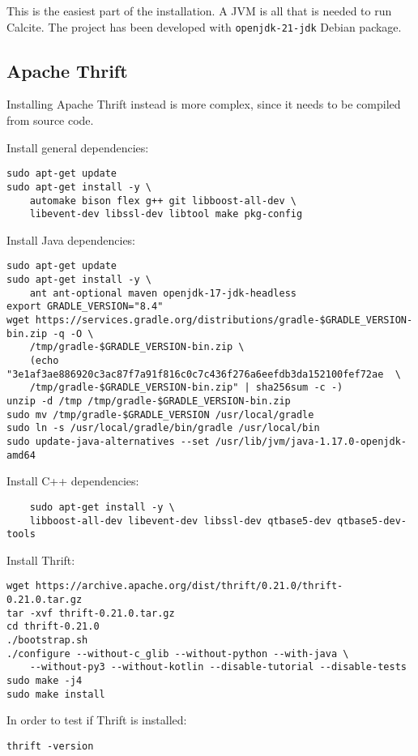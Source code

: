 \documentclass[a4paper, 10pt]{article}
\begin{document}
This is the easiest part of the installation. A JVM is all that is needed to run Calcite. The project has been developed with \texttt{openjdk-21-jdk} Debian package.

\subsection{Apache Thrift}

Installing Apache Thrift instead is more complex, since it needs to be compiled from source code.

Install general dependencies:
\begin{verbatim}
sudo apt-get update
sudo apt-get install -y \
    automake bison flex g++ git libboost-all-dev \
    libevent-dev libssl-dev libtool make pkg-config
\end{verbatim}

Install Java dependencies:
\begin{verbatim}
sudo apt-get update
sudo apt-get install -y \
    ant ant-optional maven openjdk-17-jdk-headless
export GRADLE_VERSION="8.4"
wget https://services.gradle.org/distributions/gradle-$GRADLE_VERSION-bin.zip -q -O \
    /tmp/gradle-$GRADLE_VERSION-bin.zip \
    (echo "3e1af3ae886920c3ac87f7a91f816c0c7c436f276a6eefdb3da152100fef72ae  \
    /tmp/gradle-$GRADLE_VERSION-bin.zip" | sha256sum -c -)
unzip -d /tmp /tmp/gradle-$GRADLE_VERSION-bin.zip
sudo mv /tmp/gradle-$GRADLE_VERSION /usr/local/gradle
sudo ln -s /usr/local/gradle/bin/gradle /usr/local/bin
sudo update-java-alternatives --set /usr/lib/jvm/java-1.17.0-openjdk-amd64
\end{verbatim}

Install C++ dependencies:
\begin{verbatim}
    sudo apt-get install -y \
    libboost-all-dev libevent-dev libssl-dev qtbase5-dev qtbase5-dev-tools
\end{verbatim}

Install Thrift:
\begin{verbatim}
wget https://archive.apache.org/dist/thrift/0.21.0/thrift-0.21.0.tar.gz
tar -xvf thrift-0.21.0.tar.gz
cd thrift-0.21.0
./bootstrap.sh
./configure --without-c_glib --without-python --with-java \
    --without-py3 --without-kotlin --disable-tutorial --disable-tests
sudo make -j4
sudo make install
\end{verbatim}

In order to test if Thrift is installed:
\begin{verbatim}
thrift -version
\end{verbatim}
\end{document}
